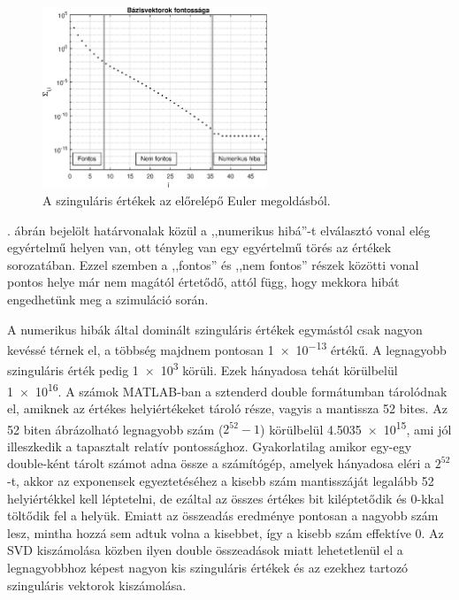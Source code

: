            \begin{figure}[h!]
                \centering
                \includegraphics[width=0.6\textwidth]{kep/euler_0.15_4_sv.eps}
                \caption{A szinguláris értékek az előrelépő Euler megoldásból.}
                \label{fig:sigma}
            \end{figure}
            . ábrán bejelölt határvonalak közül a ,,numerikus hibá''-t elválasztó vonal elég egyértelmű helyen van, ott tényleg van egy egyértelmű törés az értékek sorozatában. Ezzel szemben a ,,fontos'' és ,,nem fontos'' részek közötti vonal pontos helye már nem magától értetődő, attól függ, hogy mekkora hibát engedhetünk meg a szimuláció során.
            \par
            A numerikus hibák által dominált szinguláris értékek egymástól csak nagyon kevéssé térnek el, a többség majdnem pontosan \num{1e-13} értékű. A legnagyobb szinguláris érték pedig \num{1e3} körüli. Ezek hányadosa tehát körülbelül \num{1e16}. A számok MATLAB-ban a sztenderd double formátumban tárolódnak el, amiknek az értékes helyiértékeket tároló része, vagyis a mantissza 52 bites. Az 52 biten ábrázolható legnagyobb szám ($2^{52}-1$) körülbelül \num{4.5035e15}, ami jól illeszkedik a tapasztalt relatív pontossághoz. Gyakorlatilag amikor egy-egy double-ként tárolt számot adna össze a számítógép, amelyek hányadosa eléri a $2^{52}$-t, akkor az exponensek egyeztetéséhez a kisebb szám mantisszáját legalább 52 helyiértékkel kell léptetelni, de ezáltal az összes értékes bit kiléptetődik és 0-kkal töltődik fel a helyük. Emiatt az összeadás eredménye pontosan a nagyobb szám lesz, mintha hozzá sem adtuk volna a kisebbet, így a kisebb szám effektíve 0. Az SVD kiszámolása közben  ilyen double összeadások miatt lehetetlenül el a legnagyobbhoz képest nagyon kis szinguláris értékek és az ezekhez tartozó szinguláris vektorok kiszámolása.
            \par
